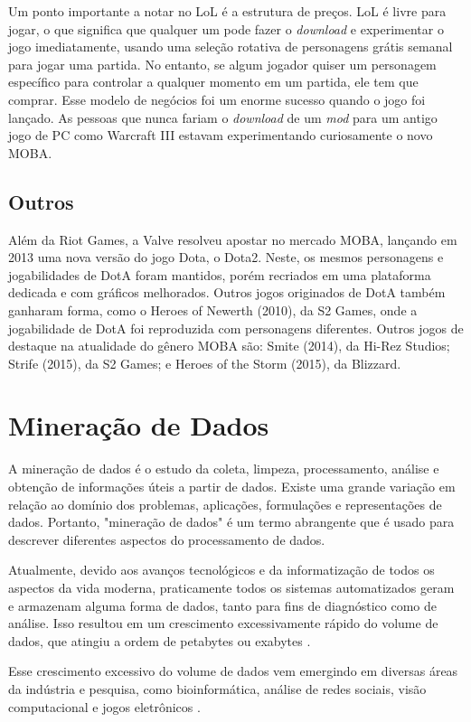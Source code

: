 Um ponto importante a notar no LoL é a estrutura de preços. LoL é livre para jogar, o que significa que qualquer um pode fazer o \textit{download} e experimentar o jogo imediatamente, usando uma seleção rotativa de personagens grátis semanal para jogar uma partida. No entanto, se algum jogador quiser um personagem específico para controlar a qualquer momento em um partida, ele tem que comprar. Esse modelo de negócios foi um enorme sucesso quando o jogo foi lançado. As pessoas que nunca fariam o \textit{download} de um \textit{mod} para um antigo jogo de PC como Warcraft III estavam experimentando curiosamente o novo MOBA.

\subsection{Outros}
Além da Riot Games, a Valve resolveu apostar no mercado MOBA, lançando em 2013 uma nova versão do jogo Dota, o Dota2. Neste, os mesmos personagens e jogabilidades de DotA foram mantidos, porém recriados em uma plataforma dedicada e com gráficos melhorados. Outros jogos originados de DotA também ganharam forma, como o Heroes of Newerth (2010), da S2 Games, onde a jogabilidade de DotA foi reproduzida com personagens diferentes. Outros jogos de destaque na atualidade do gênero MOBA são: Smite (2014), da Hi-Rez Studios; Strife (2015), da S2 Games; e Heroes of the Storm (2015), da Blizzard.

\section{Mineração de Dados}
A mineração de dados é o estudo da coleta, limpeza, processamento, análise e obtenção de informações úteis a partir de dados. Existe uma grande variação em relação ao domínio dos problemas, aplicações, formulações e representações de dados. Portanto, "mineração de dados" é um termo abrangente que é usado para descrever diferentes aspectos do processamento de dados\cite{aggarwal2015data}.

Atualmente, devido aos avanços tecnológicos e da informatização de todos os aspectos da vida moderna, praticamente todos os sistemas automatizados geram e armazenam alguma forma de dados, tanto para fins de diagnóstico como de análise. Isso resultou em um crescimento excessivamente rápido do volume de dados, que atingiu a ordem de petabytes ou exabytes \cite{aggarwal2015data}.

Esse crescimento excessivo do volume de dados vem emergindo em diversas áreas da indústria e pesquisa, como bioinformática, análise de redes sociais, visão computacional e jogos eletrônicos \cite{el2016game}.

